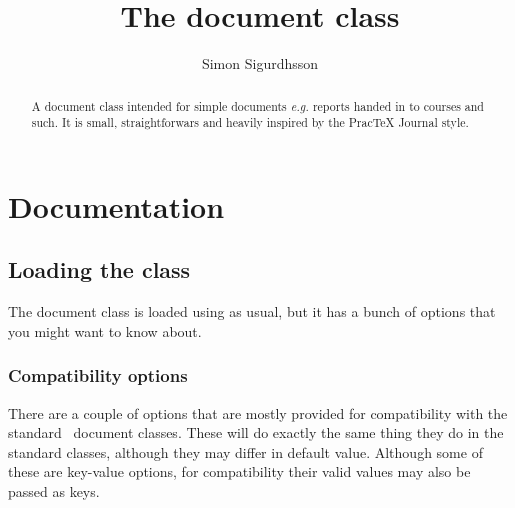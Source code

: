 \documentclass{skdoc}
\begin{document}

	\title{The \textbf{\thepackage} document class}
	\author{Simon Sigurdhsson}

	\maketitle
	\begin{abstract}
		A document class intended for simple documents \emph{e.g.}
		reports handed in to courses and such. It is small,
		straightforwars and heavily inspired by the Prac\TeX{}
		Journal style.
	\end{abstract}
	\tableofcontents

	\section{Documentation}
	\subsection{Loading the class}
	The document class is loaded using  as usual,
	but it has a bunch of options that you might want to know about.

	\subsubsection{Compatibility options}
	There are a couple of options that are mostly provided for
	compatibility with the standard \LaTeXe\ document classes. These
	will do exactly the same thing they do in the standard classes,
	although they may differ in default value. Although some of these
	are key-value options, for compatibility their valid values may
	also be passed as keys.
\end{document}
